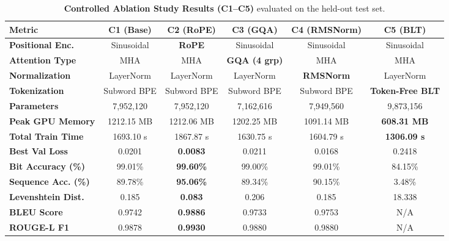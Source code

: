 \documentclass[12pt,a4paper]{article}
\begin{document}

\begin{table}[H]
\centering
\small
\caption{\textbf{Controlled Ablation Study Results (C1--C5)} evaluated on the held-out test set.}
\label{tab:ablation_results}
\begin{tabularx}{\textwidth}{lccccc}
\toprule
\textbf{Metric} & \textbf{C1 (Base)} & \textbf{C2 (RoPE)} & \textbf{C3 (GQA)} & \textbf{C4 (RMSNorm)} & \textbf{C5 (BLT)} \\
\midrule
\textbf{Positional Enc.} & Sinusoidal & \textbf{RoPE} & Sinusoidal & Sinusoidal & Sinusoidal \\
\textbf{Attention Type}  & MHA & MHA & \textbf{GQA (4 grp)} & MHA & MHA \\
\textbf{Normalization}   & LayerNorm & LayerNorm & LayerNorm & \textbf{RMSNorm} & LayerNorm \\
\textbf{Tokenization}    & Subword BPE & Subword BPE & Subword BPE & Subword BPE & \textbf{Token-Free BLT} \\
\midrule
\textbf{Parameters}      & 7,952,120 & 7,952,120 & 7,162,616 & 7,949,560 & 9,873,156 \\
\textbf{Peak GPU Memory} & 1212.15 MB & 1212.06 MB & 1202.25 MB & 1091.14 MB & \textbf{608.31 MB} \\
\textbf{Total Train Time}& 1693.10 s & 1867.87 s & 1630.75 s & 1604.79 s & \textbf{1306.09 s} \\
\textbf{Best Val Loss}   & 0.0201 & \textbf{0.0083} & 0.0211 & 0.0168 & 0.2418 \\
\midrule
\textbf{Bit Accuracy (\%)} & 99.01\% & \textbf{99.60\%} & 99.00\% & 99.01\% & 84.15\% \\
\textbf{Sequence Acc. (\%)}& 89.78\% & \textbf{95.06\%} & 89.34\% & 90.15\% & 3.48\% \\
\textbf{Levenshtein Dist.} & 0.185 & \textbf{0.083} & 0.206 & 0.185 & 18.338 \\
\textbf{BLEU Score}        & 0.9742 & \textbf{0.9886} & 0.9733 & 0.9753 & N/A \\
\textbf{ROUGE-L F1}        & 0.9878 & \textbf{0.9930} & 0.9880 & 0.9880 & N/A \\
\bottomrule
\end{tabularx}
\end{table}
\end{document}
